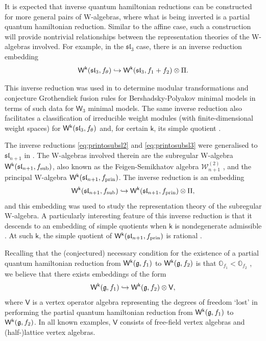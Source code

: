 \documentclass[10pt,a4paper]{amsart}
\numberwithin{equation}{section}
\newcommand{\kk}{\mathsf{k}}   %
\DeclarePairedDelimiter{\brac}{\lparen}{\rparen}   %
\newcommand{\alg}[1]{\mathfrak{#1}}  %
\newcommand{\VOA}[1]{\mathsf{#1}}    %
\newcommand{\SLA}[2]{\alg{#1}_{#2}}                      %
\newcommand{\slthree}{\SLA{sl}{3}}
\newcommand{\slnpone}{\SLA{sl}{n+1}}
\newcommand{\fsub}{f_\textup{sub}}                                  %
\newcommand{\fprin}{f_\textup{prin}}                                %
\newcommand{\Wsymb}{\VOA{W}}
\newcommand{\halflattice}{\Pi}                          		  %
\newcommand{\uQHR}[3]{\Wsymb^{#1}\brac{#2,#3}}                    %
\theoremstyle{plain}
\begin{document}
It is expected that inverse quantum hamiltonian reductions can be constructed for more general pairs of W-algebras, where what is being inverted is a partial quantum hamiltonian reduction. Similar to the affine case, such a construction will provide nontrivial relationships between the representation theories of the W-algebras involved. For example, in the $\slthree$ case, there is an inverse reduction embedding \cite{AdaRea20}
%
\begin{equation} \label{eq:printosubsl3}
    \uQHR{\kk}{\slthree}{f_\theta} \hookrightarrow \uQHR{\kk}{\slthree}{f_1+f_2} \otimes \halflattice.
\end{equation}

This inverse reduction was used in \cite{Feh21b} to determine modular transformations and conjecture Grothendiek fusion rules for Bershadsky-Polyakov minimal models in terms of such data for $\VOA{W}_3$ minimal models. The same inverse reduction also facilitates a classification of irreducible weight modules (with finite-dimensional weight spaces) for $\uQHR{\kk}{\slthree}{f_\theta}$ and, for certain $\kk$, its simple quotient \cite{AdaWeight23}.  

The inverse reductions \eqref{eq:printosubsl2} and \eqref{eq:printosubsl3} were generalised to $\slnpone$ in \cite{Feh21c}. The W-algebras involved therein are the subregular W-algebra $\uQHR{\kk}{\slnpone}{\fsub}$, also known as the Feigen-Semikhatov algebra $\mathcal{W}^{(2)}_{n+1}$ \cite{FS04}, and the principal W-algebra $\uQHR{\kk}{\slnpone}{\fprin}$. The inverse reduction is an embedding 
%
\begin{equation}
    \uQHR{\kk}{\slnpone}{\fsub} \hookrightarrow \uQHR{\kk}{\slnpone}{\fprin} \otimes \halflattice,
\end{equation}
%
and this embedding was used to study the representation theory of the subregular W-algebra. A particularly interesting feature of this inverse reduction is that it descends to an embedding of simple quotients when $\kk$ is nondegenerate admissible \cite[Thm.~5.1]{Feh21c}. At such $\kk$, the simple quotient of $\uQHR{\kk}{\slnpone}{\fprin}$ is rational \cite{AraRat15}.

Recalling that the (conjectured) necessary condition for the existence of a partial quantum hamiltonian reduction from $\uQHR{\kk}{\mathfrak{g}}{f_1}$ to $\uQHR{\kk}{\mathfrak{g}}{f_2}$ is that $\mathbb{O}_{f_1} < \mathbb{O}_{f_2}$ , we believe that there exists embeddings of the form
%
\begin{equation} \label{eq:invembGeneral}
    \uQHR{\kk}{\mathfrak{g}}{f_1} \hookrightarrow \uQHR{\kk}{\mathfrak{g}}{f_2} \otimes \VOA{V},
\end{equation}
%
where $\VOA{V}$ is a vertex operator algebra representing the degrees of freedom `lost' in performing the partial quantum hamiltonian reduction from $ \uQHR{\kk}{\mathfrak{g}}{f_1}$ to $ \uQHR{\kk}{\mathfrak{g}}{f_2}$. In all known examples, $\VOA{V}$ consists of free-field vertex algebras and (half-)lattice vertex algebras.
\end{document}

